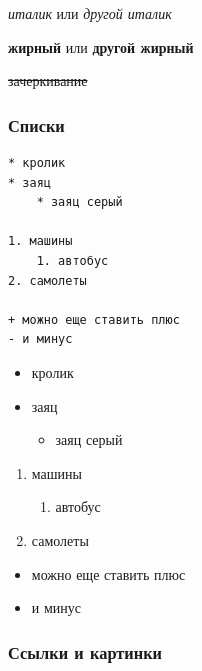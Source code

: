 \documentclass[
]{book}
\providecommand{\tightlist}{%
  \setlength{\itemsep}{0pt}\setlength{\parskip}{0pt}}
\begin{document}
\emph{италик} или \emph{другой италик}

\textbf{жирный} или \textbf{другой жирный}

\sout{зачеркивание}

\hypertarget{ux441ux43fux438ux441ux43aux438}{%
\subsubsection{Списки}\label{ux441ux43fux438ux441ux43aux438}}

\begin{verbatim}
* кролик
* заяц
    * заяц серый

1. машины
    1. автобус
2. самолеты

+ можно еще ставить плюс
- и минус
\end{verbatim}

\begin{itemize}
\tightlist
\item
  кролик
\item
  заяц

  \begin{itemize}
  \tightlist
  \item
    заяц серый
  \end{itemize}
\end{itemize}

\begin{enumerate}
\def\labelenumi{\arabic{enumi}.}
\tightlist
\item
  машины

  \begin{enumerate}
  \def\labelenumii{\arabic{enumii}.}
  \tightlist
  \item
    автобус
  \end{enumerate}
\item
  самолеты
\end{enumerate}

\begin{itemize}
\tightlist
\item
  можно еще ставить плюс
\item
  и минус
\end{itemize}

\hypertarget{ux441ux441ux44bux43bux43aux438-ux438-ux43aux430ux440ux442ux438ux43dux43aux438}{%
\subsubsection{Ссылки и картинки}\label{ux441ux441ux44bux43bux43aux438-ux438-ux43aux430ux440ux442ux438ux43dux43aux438}}
\end{document}
